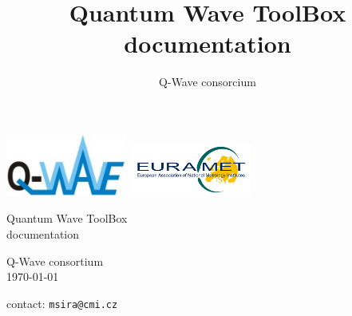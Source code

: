 \documentclass[12pt,a4paper,oneside]{report} %
\begin{document}
\renewcommand\floatpagefraction{.9} \renewcommand\topfraction{.9} \renewcommand\bottomfraction{.9} \renewcommand\textfraction{.1} \setcounter{totalnumber}{50} \setcounter{topnumber}{50} \setcounter{bottomnumber}{50} %
\renewcommand{\labelitemi}{--}          %
\setlength{\unitlength}{1mm}            %


\newenvironment{tightdesc}{\begin{description}[itemsep=0pt]} 
                              {\end{description}}

\title{Quantum Wave ToolBox documentation}
\author{Q-Wave consorcium}

\thispagestyle{empty}
\begin{center}
\includegraphics[width=0.3\textwidth]{sources/qwlogo.jpg}
\hfill
\includegraphics[width=0.3\textwidth]{sources/eurametlogo.jpg}

        \vspace{8em}
        {\huge
        Quantum Wave ToolBox\\
        documentation}\\

        \vfill
        {\Huge \color{red}{BETA version}}

        \vfill
        {\Large Q-Wave consortium}\\
        \today
        
        \bigskip
        contact: \texttt{msira@cmi.cz}

        \vfill
\end{center}
\newpage
\end{document}
